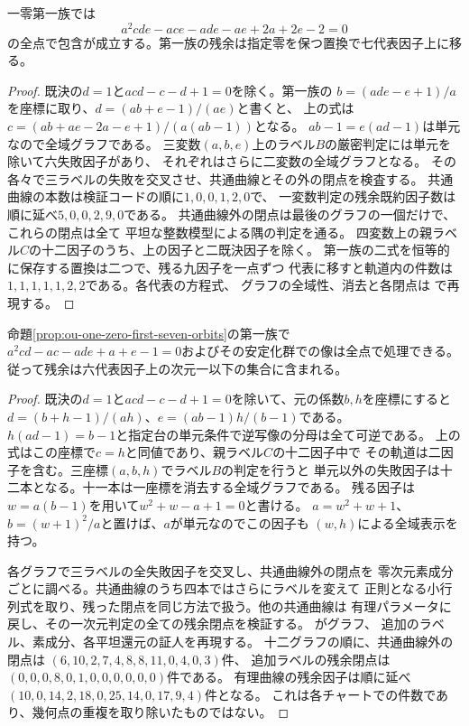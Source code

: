 \begin{proposition}[一零第一族の追加因子と残る七軌道]
\label{prop:ou-one-zero-first-seven-orbits}
一零第一族では
\[
 a^2cde-ace-ade-ae+2a+2e-2=0
\]
の全点で包含が成立する。第一族の残余は指定零を保つ置換で七代表因子上に移る。
\end{proposition}
\begin{proof}
既決の$d=1$と$acd-c-d+1=0$を除く。第一族の
$b=(ade-e+1)/a$を座標に取り、$d=(ab+e-1)/(ae)$と書くと、
上の式は$c=(ab+ae-2a-e+1)/(a(ab-1))$となる。
$ab-1=e(ad-1)$は単元なので全域グラフである。
三変数$(a,b,e)$上のラベル$B$の厳密判定には単元を除いて六失敗因子があり、
それぞれはさらに二変数の全域グラフとなる。
その各々で三ラベルの失敗を交叉させ、共通曲線とその外の閉点を検査する。
共通曲線の本数は検証コードの順に$1,0,0,1,2,0$で、
一変数判定の残余既約因子数は順に延べ$5,0,0,2,9,0$である。
共通曲線外の閉点は最後のグラフの一個だけで、これらの閉点は全て
平坦な整数模型による隅の判定を通る。
四変数上の親ラベル$C$の十二因子のうち、上の因子と二既決因子を除く。
第一族の二式を恒等的に保存する置換は二つで、残る九因子を一点ずつ
代表に移すと軌道内の件数は$1,1,1,1,1,2,2$である。各代表の方程式、
グラフの全域性、消去と各閉点は
で再現する。
\end{proof}

\begin{proposition}[一零第一族の$c=h$軌道]
\label{prop:ou-one-zero-first-junction}
命題\ref{prop:ou-one-zero-first-seven-orbits}の第一族で
$a^2cd-ac-ade+a+e-1=0$およびその安定化群での像は全点で処理できる。
従って残余は六代表因子上の次元一以下の集合に含まれる。
\end{proposition}
\begin{proof}
既決の$d=1$と$acd-c-d+1=0$を除いて、元の係数$b,h$を座標にすると
$d=(b+h-1)/(ah)$、$e=(ab-1)h/(b-1)$である。
$h(ad-1)=b-1$と指定台の単元条件で逆写像の分母は全て可逆である。
上の式はこの座標で$c=h$と同値であり、親ラベル$C$の十二因子中で
その軌道は二因子を含む。三座標$(a,b,h)$でラベル$B$の判定を行うと
単元以外の失敗因子は十二本となる。十一本は一座標を消去する全域グラフである。
残る因子は$w=a(b-1)$を用いて$w^2+w-a+1=0$と書ける。
$a=w^2+w+1$、$b=(w+1)^2/a$と置けば、$a$が単元なのでこの因子も
$(w,h)$による全域表示を持つ。

各グラフで三ラベルの全失敗因子を交叉し、共通曲線外の閉点を
零次元素成分ごとに調べる。共通曲線のうち四本ではさらにラベルを変えて
正則となる小行列式を取り、残った閉点を同じ方法で扱う。他の共通曲線は
有理パラメータに戻し、その一次元判定の全ての残余閉点を検証する。
がグラフ、
追加のラベル、素成分、各平坦還元の証人を再現する。
十二グラフの順に、共通曲線外の閉点は
$(6,10,2,7,4,8,8,11,0,4,0,3)$件、
追加ラベルの残余閉点は$(0,0,0,8,0,1,0,0,0,0,0,0)$件である。
有理曲線の残余因子は順に延べ$(10,0,14,2,18,0,25,14,0,17,9,4)$件となる。
これは各チャートでの件数であり、幾何点の重複を取り除いたものではない。
\end{proof}

